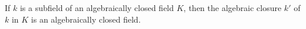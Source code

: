 If $k$ is a subfield of an algebraically closed field $K$, then the algebraic closure $k'$ of $k$ in $K$ is an algebraically closed field.
